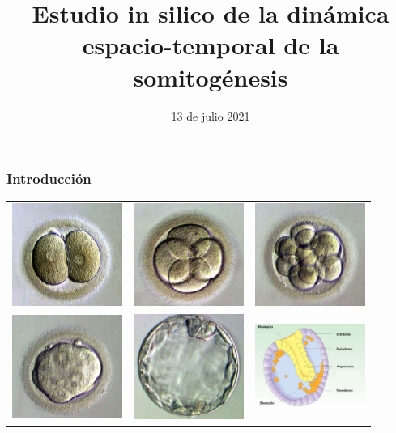 \documentclass[xcolor=table, xllnames]{beamer}
\title[]{Estudio in silico de la din\'amica espacio-temporal de la somitog\'enesis}
\institute[] {
{\large Examen de Doctorado} \\[.2cm] 
Presenta: Jes\'us Pantoja Hern\'andez \\[.2cm]

\begin{tabular}{rl}
	Tutor:   & Dr. Mois\'es Santill\'an Zer\'on \\ 
	Sinodales:& Dr. Jes\'us G. Rodr\'iguez Gonz\'alez\\
			  & Dr. Daniel P. S\'anchez  Herrera\\
			  & Dr. Bruno A. Escalante Acosta\\
			  & Dr. V\'ictor F. Breña Medina \\
			  
\end{tabular}

}
\date{13 de julio 2021}
\begin{document}
\begin{frame}
\titlepage %
\end{frame}


\begin{frame}
	\frametitle{Introducci\'on} 
	\begin{tabular}{ccc}
		\includegraphics[width=3.6cm]{Figuras/seg1.jpg} & %
		\includegraphics[width=3.6cm]{Figuras/seg2.jpg} & %
		\includegraphics[width=3.6cm]{Figuras/seg3.jpg} \\ \pause
		\includegraphics[width=3.6cm]{Figuras/seg4.jpg} & \pause \includegraphics[width=3.6cm]{Figuras/seg5.jpg} & \pause 
		\includegraphics[width=3.6cm,height=3.4cm]{Figuras/blastoporo2.jpg}
	\end{tabular}
\end{frame}
\end{document}
